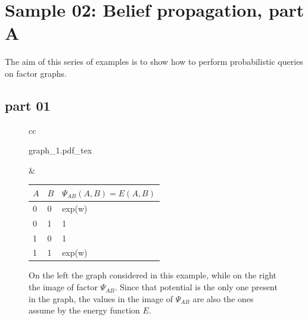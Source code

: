 \section{Sample 02: Belief propagation, part A}

The aim of this series of examples is to show how to perform probabilistic queries on factor graphs.

\subsection{part 01}

\begin{figure}
\begin{tabular}{cc}
\begin{minipage}[t]{0.25 \columnwidth}
	\centering
\def\svgwidth{0.9 \textwidth}
{graph_1.pdf_tex} 
\end{minipage} 
 & 
\begin{minipage}[t]{0.48 \columnwidth}
\begin{tabular}{|l|l|l|}
$A$ & $B$ & $\Psi_{AB}(A,B) = E(A,B)$ \\
\hline
0 & 0 & exp(w) \\
\hline
0 & 1 & 1 \\
\hline
1 & 0 & 1 \\
\hline
1 & 1 & exp(w) \\
\hline
\end{tabular}
\end{minipage} 
\end{tabular}
\caption{On the left the graph considered in this example, while on the right the image of factor $\Psi_{AB}$. Since that potential is the only one present in the graph, the values in the image of $\Psi_{AB}$ are also the ones assume by the energy function $E$.}
\label{fig:sample_02:0}
\end{figure}


